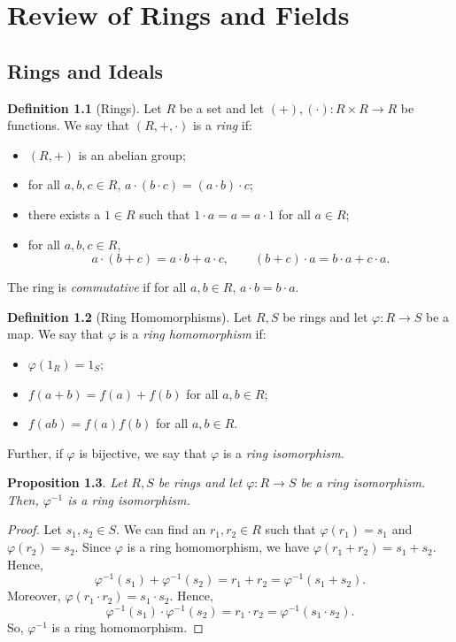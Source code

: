 \documentclass[a4paper, openany]{memoir}
\theoremstyle{definition}
\newtheorem{definition}{Definition}[section]
\theoremstyle{plain}
\newtheorem{proposition}[definition]{Proposition}
\begin{document}
    \chapter{Review of Rings and Fields}
    \section{Rings and Ideals}
    \begin{definition}[Rings]
        Let $R$ be a set and let $(+), (\cdot) \colon R \times R \to R$ be functions. We say that $(R, +, \cdot)$ is a \emph{ring} if:
        \begin{itemize}
            \item $(R, +)$ is an abelian group;
            \item for all $a, b, c \in R$, $a \cdot (b \cdot c) = (a \cdot b) \cdot c$;
            \item there exists a $1 \in R$ such that $1 \cdot a = a = a \cdot 1$ for all $a \in R$;
            \item for all $a, b, c \in R$,
            \[a \cdot (b + c) = a \cdot b + a \cdot c, \qquad (b + c) \cdot a = b \cdot a + c \cdot a.\]
        \end{itemize}
        The ring is \emph{commutative} if for all $a, b \in R$, $a \cdot b = b \cdot a$.
    \end{definition}

    \begin{definition}[Ring Homomorphisms]
        Let $R, S$ be rings and let $\varphi \colon R \to S$ be a map. We say that $\varphi$ is a \emph{ring homomorphism} if:
        \begin{itemize}
            \item $\varphi(1_R) = 1_S$;
            \item $f(a + b) = f(a) + f(b)$ for all $a, b \in R$;
            \item $f(ab) = f(a) f(b)$ for all $a, b \in R$.
        \end{itemize}
        Further, if $\varphi$ is bijective, we say that $\varphi$ is a \emph{ring isomorphism}.
    \end{definition}

    \begin{proposition}
        Let $R, S$ be rings and let $\varphi \colon R \to S$ be a ring isomorphism. Then, $\varphi^{-1}$ is a ring isomorphism.
    \end{proposition}
    \begin{proof}
        Let $s_1, s_2 \in S$. We can find an $r_1, r_2 \in R$ such that $\varphi(r_1) = s_1$ and $\varphi(r_2) = s_2$. Since $\varphi$ is a ring homomorphism, we have $\varphi(r_1 + r_2) = s_1 + s_2$. Hence,
        \[\varphi^{-1}(s_1) + \varphi^{-1}(s_2) = r_1 + r_2 = \varphi^{-1}(s_1 + s_2).\]
        Moreover, $\varphi(r_1 \cdot r_2) = s_1 \cdot s_2$. Hence,
        \[\varphi^{-1}(s_1) \cdot \varphi^{-1}(s_2) = r_1 \cdot r_2 = \varphi^{-1}(s_1 \cdot s_2).\]
        So, $\varphi^{-1}$ is a ring homomorphism.
    \end{proof}
\end{document}
